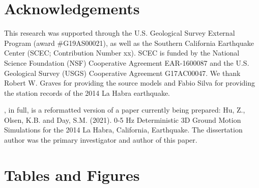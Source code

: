 \section*{Acknowledgements}

This research was supported through the U.S. Geological Survey External Program (award \#G19AS00021), as well as the Southern California Earthquake Center (SCEC; Contribution Number xx). SCEC is funded by the National Science Foundation (NSF) Cooperative Agreement EAR-1600087 and the U.S. Geological Survey (USGS) Cooperative Agreement G17AC00047. We thank Robert W. Graves for providing the source models and Fabio Silva for providing the station records of the 2014 La Habra earthquake.

, in full, is a reformatted version of a paper currently being prepared: Hu, Z., Olsen, K.B. and Day, S.M. (2021). 0-5 Hz Deterministic 3D Ground Motion Simulations for the 2014 La Habra, California, Earthquake. The dissertation author was the primary investigator and author of this paper.

\newpage
\section*{Tables and Figures}
%


